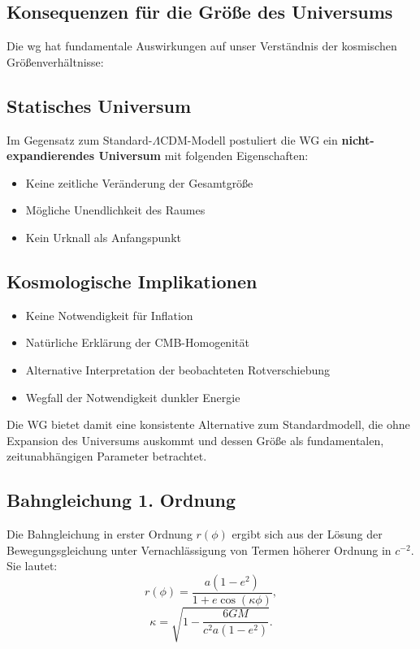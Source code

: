 \subsection{Konsequenzen für die Größe des Universums}
Die \gls{wg} hat fundamentale Auswirkungen auf unser Verständnis der kosmischen Größenverhältnisse:

\subsection{Statisches Universum}
Im Gegensatz zum Standard-$\Lambda$CDM-Modell postuliert die WG ein \textbf{nicht-expandierendes Universum} mit folgenden Eigenschaften:

\begin{itemize}
\item Keine zeitliche Veränderung der Gesamtgröße
\item Mögliche Unendlichkeit des Raumes
\item Kein Urknall als Anfangspunkt
\end{itemize}

\subsection{Kosmologische Implikationen}
\begin{itemize}
\item Keine Notwendigkeit für Inflation
\item Natürliche Erklärung der CMB-Homogenität
\item Alternative Interpretation der beobachteten Rotverschiebung
\item Wegfall der Notwendigkeit dunkler Energie
\end{itemize}

Die WG bietet damit eine konsistente Alternative zum Standardmodell, die ohne Expansion des Universums auskommt und dessen Größe als fundamentalen, zeitunabhängigen Parameter betrachtet.


\subsection{Bahngleichung 1. Ordnung}
Die Bahngleichung in erster Ordnung $r(\phi)$ ergibt sich aus der Lösung der Bewegungsgleichung unter Vernachlässigung von Termen höherer Ordnung in $c^{-2}$. Sie lautet:
\begin{equation}
r(\phi) = \frac{a(1 - e^2)}{1 + e \cos(\kappa \phi)},    
\end{equation}
\begin{equation}
\kappa = \sqrt{1 - \frac{6GM}{c^2 a(1 - e^2)}}.
\end{equation}

